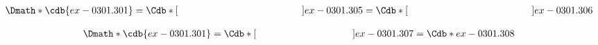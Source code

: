 \documentclass[12pt]{cdblatex}
\begin{document}
\clearpage

\begin{dgroup*}[spread={3pt}]
   \Dmath*{\cdb{ex-0301.301} = \Cdb*[\hskip4.5cm\hfill]{ex-0301.305}
                             = \Cdb*[\hskip4.5cm\hfill]{ex-0301.306}}
\end{dgroup*}

\clearpage

\begin{dgroup*}[spread={3pt}]
   \Dmath*{\cdb{ex-0301.301} = \Cdb*[\hskip3.5cm\hfill]{ex-0301.307}
                             = \Cdb*{ex-0301.308}}
\end{dgroup*}
\end{document}
